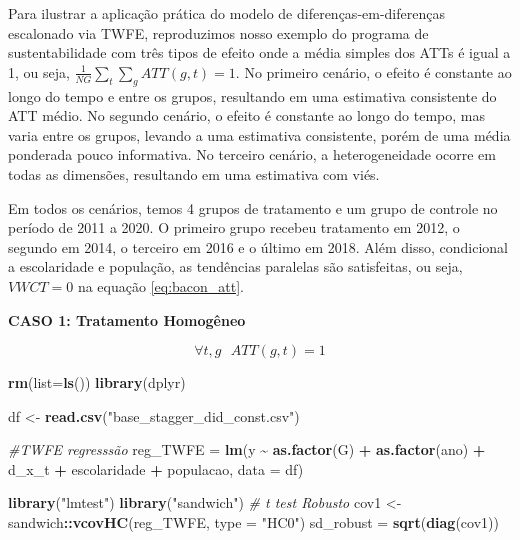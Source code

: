 \documentclass[portugues]{article}
\newenvironment{Shaded}{\begin{snugshade}}{\end{snugshade}}
\newcommand{\AttributeTok}[1]{\textcolor[rgb]{0.13,0.29,0.53}{#1}}
\newcommand{\CommentTok}[1]{\textcolor[rgb]{0.56,0.35,0.01}{\textit{#1}}}
\newcommand{\FunctionTok}[1]{\textcolor[rgb]{0.13,0.29,0.53}{\textbf{#1}}}
\newcommand{\NormalTok}[1]{#1}
\newcommand{\OtherTok}[1]{\textcolor[rgb]{0.56,0.35,0.01}{#1}}
\newcommand{\SpecialCharTok}[1]{\textcolor[rgb]{0.81,0.36,0.00}{\textbf{#1}}}
\newcommand{\StringTok}[1]{\textcolor[rgb]{0.31,0.60,0.02}{#1}}
\begin{document}
\begin{boxA}
Para ilustrar a aplicação prática do modelo de diferenças-em-diferenças escalonado via TWFE, reproduzimos nosso exemplo do programa de sustentabilidade com três tipos de efeito onde a média simples dos ATTs é igual a 1, ou seja, $\frac{1}{NG}\sum_t \sum_g ATT(g,t) = 1$. No primeiro cenário, o efeito é constante ao longo do tempo e entre os grupos, resultando em uma estimativa consistente do ATT médio. No segundo cenário, o efeito é constante ao longo do tempo, mas varia entre os grupos, levando a uma estimativa consistente, porém de uma média ponderada pouco informativa. No terceiro cenário, a heterogeneidade ocorre em todas as dimensões, resultando em uma estimativa com viés.

Em todos os cenários, temos 4 grupos de tratamento e um grupo de controle no período de 2011 a 2020. O primeiro grupo recebeu tratamento em 2012, o segundo em 2014, o terceiro em 2016 e o último em 2018. Além disso, condicional a escolaridade e população, as tendências paralelas são satisfeitas, ou seja, $VWCT = 0$ na equação \eqref{eq:bacon_att}.

\vspace{3mm}

\textbf{CASO 1: Tratamento Homogêneo}

$$ \forall t,g \text{ } ATT(g,t) = 1 $$


\begin{Shaded}
\begin{Highlighting}[]
\FunctionTok{rm}\NormalTok{(}\AttributeTok{list=}\FunctionTok{ls}\NormalTok{())}
\FunctionTok{library}\NormalTok{(dplyr)}


\NormalTok{df }\OtherTok{\textless{}{-}} \FunctionTok{read.csv}\NormalTok{(}\StringTok{"base\_stagger\_did\_const.csv"}\NormalTok{)}
\end{Highlighting}
\end{Shaded}

\begin{Shaded}
\begin{Highlighting}[]
\CommentTok{\#TWFE regresssão}
\NormalTok{reg\_TWFE }\OtherTok{=} \FunctionTok{lm}\NormalTok{(y }\SpecialCharTok{\textasciitilde{}} \FunctionTok{as.factor}\NormalTok{(G) }\SpecialCharTok{+} \FunctionTok{as.factor}\NormalTok{(ano) }\SpecialCharTok{+}\NormalTok{ d\_x\_t }\SpecialCharTok{+}
\NormalTok{ escolaridade }\SpecialCharTok{+}\NormalTok{ populacao, }\AttributeTok{data =}\NormalTok{ df)}

\FunctionTok{library}\NormalTok{(}\StringTok{"lmtest"}\NormalTok{)}
\FunctionTok{library}\NormalTok{(}\StringTok{"sandwich"}\NormalTok{)}
\CommentTok{\# t test Robusto}
\NormalTok{cov1 }\OtherTok{\textless{}{-}}\NormalTok{ sandwich}\SpecialCharTok{::}\FunctionTok{vcovHC}\NormalTok{(reg\_TWFE, }\AttributeTok{type =} \StringTok{"HC0"}\NormalTok{)}
\NormalTok{sd\_robust }\OtherTok{=} \FunctionTok{sqrt}\NormalTok{(}\FunctionTok{diag}\NormalTok{(cov1))}


\end{Highlighting}
\end{Shaded}
\end{boxA}
\end{document}
